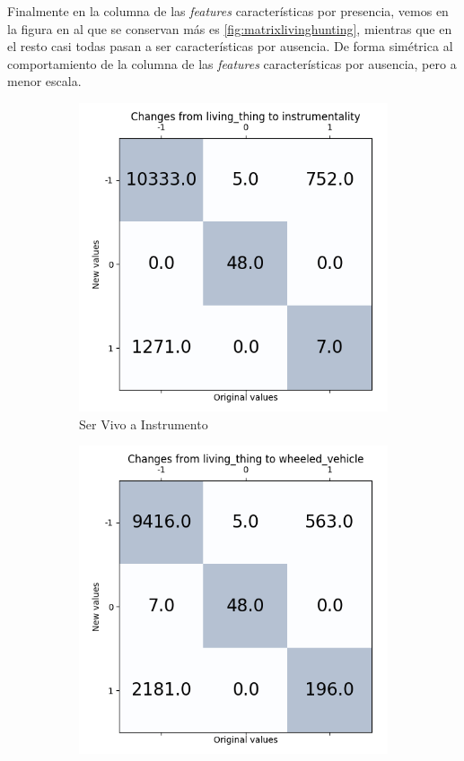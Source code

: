 \documentclass[12,twoside]{TFG-GM}
\theoremstyle{definition}
\theoremstyle{remark}
\begin{document}
Finalmente en la columna de las \textit{features} características por presencia, vemos en la figura en al que se conservan más es \ref{fig:matrixlivinghunting}, mientras que en el resto casi todas pasan a ser características por ausencia. De forma simétrica al comportamiento de la columna de las \textit{features} características por ausencia, pero a menor escala. 
 \begin{figure}[ht] 
	\centering
	\begin{subfigure}[b]{0.3\textwidth}
		\includegraphics[width=\textwidth] {Images/plots/25/matrices/matrixlivinginstrum.png}
		\caption{Ser Vivo a Instrumento \label{fig:matrixlivinginstrum}}
	\end{subfigure}
	\begin{subfigure}[b]{0.3\textwidth}
		\includegraphics[width=\textwidth]  {Images/plots/25/matrices/matrixLivingWheel.png}

\end{subfigure}
\end{figure}
\end{document}

